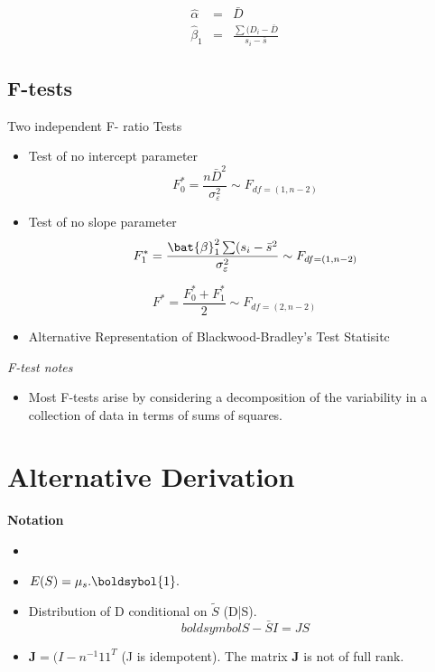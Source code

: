 \documentclass[12pt]{article}
\begin{document}
\begin{eqnarray}
\hat{\alpha} &=& \bar{D} \\
\hat{\beta}_1 &=& \frac{\sum(D_i - \bar{D}}{s_i - \bar{s}}
\end{eqnarray}
\newpage
\subsection{F-tests}

Two independent F- ratio Tests

\begin{itemize}
\item Test of no intercept parameter
\[ F^{\ast}_0 = \frac{n\bar{D}^2}{\sigma^2_\varepsilon} \sim F_{df = (1,n-2)}\]

\item Test of no slope parameter
\[ F^{\ast}_1 = \frac{ \bat{\beta}^2_1\sum(s_i-\bar{s}^2}{\sigma^2_\varepsilon} \sim F_{df = (1,n-2)}\]
\end{itemize}

\[ F^{\ast}  = \frac{F^{\ast}_0 + F^{\ast}_1 }{2} \sim F_{df = (2,n-2)}\]
\begin{itemize}
\item Alternative Representation of Blackwood-Bradley's Test Statisitc
\end{itemize}
\textit{F-test notes}
\begin{itemize}
\item Most F-tests arise by considering a decomposition of the variability in a collection of data in terms of sums of squares. 
\end{itemize}
\section{Alternative Derivation}
\textbf{Notation}
\begin{itemize}
\item
\item $ E(S) = \mu_s.\boldsybol{1}.$
\item Distribution of D conditional on $\tilde{S}$ (D|S).
\[boldsymbol{S} - \bar{S}I = JS\]
\item $\boldsymbol{J} = (I - n^{-1}11^{T}$ (J is idempotent). The matrix $\boldsymbol{J}$ is not of full rank.

\end{itemize}
\end{document}
